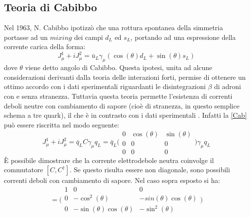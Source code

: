 \subsection{Teoria di Cabibbo}
\noindent
Nel 1963, N. Cabibbo ipotizzò che una rottura spontanea della simmetria portasse ad un $mixing$ dei campi $d_L$ ed $s_L$, portando ad una
espressione della corrente carica della forma:
\begin{equation}\label{Cab}
 J^1_{\mu} + iJ^2_{\mu} = \bar{u}_L\gamma_\mu (\cos(\theta)d_L + \sin(\theta)s_L)
\end{equation}
dove $\theta$ viene detto angolo di Cabibbo. Questa ipotesi, unita ad alcune considerazioni derivanti dalla teoria delle interazioni forti, 
permise di ottenere un ottimo accordo con i dati sperimentali riguardanti le disintegrazioni $\beta$ di adroni con e senza stranezza.
Tuttavia questa teoria permette l'esistenza di correnti deboli neutre con cambiamento di sapore (cioè di stranezza, in questo semplice schema
a tre quark), il che è in contrasto con i dati sperimentali \cite{Maiani}. Infatti la \eqref{Cab} può essere riscritta nel modo seguente:
\begin{equation}
  J^1_{\mu} + iJ^2_{\mu} = \bar{q}_L C \gamma_\mu q_L = \bar{q}_L \Bigg(\begin{matrix} 0 & \cos(\theta) & \sin(\theta) \\ 0 & 0 & 0 \\ 0 & 0 & 0 \end{matrix}\Bigg) \gamma_\mu q_L
\end{equation}
È possibile dimostrare che la corrente elettrodebole neutra coinvolge il commutatore $[C, C^{\dag}]$. Se questo risulta essere non diagonale, 
sono possibili correnti deboli con cambiamento di sapore. Nel caso sopra esposto si ha:
\begin{equation}
 [C, C^{\dag}] = \Bigg(\begin{matrix} 1 & 0 & 0 \\ 0 & -\cos^2(\theta) & -sin(\theta)\cos(\theta) \\ 0 & -\sin(\theta)\cos(\theta) & -\sin^2(\theta) \end{matrix}\Bigg)
\end{equation}

